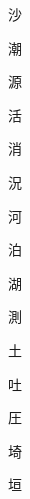 \begin{spacing}{2.5}
{\Huge \begin{CJK}{UTF8}{min} 沙\end{CJK}}\hspace{0.1cm}
{\Huge \begin{CJK}{UTF8}{min} 潮\end{CJK}}\hspace{0.1cm}
{\Huge \begin{CJK}{UTF8}{min} 源\end{CJK}}\hspace{0.1cm}
{\Huge \begin{CJK}{UTF8}{min} 活\end{CJK}}\hspace{0.1cm}
{\Huge \begin{CJK}{UTF8}{min} 消\end{CJK}}\hspace{0.1cm}
{\Huge \begin{CJK}{UTF8}{min} 況\end{CJK}}\hspace{0.1cm}
{\Huge \begin{CJK}{UTF8}{min} 河\end{CJK}}\hspace{0.1cm}
{\Huge \begin{CJK}{UTF8}{min} 泊\end{CJK}}\hspace{0.1cm}
{\Huge \begin{CJK}{UTF8}{min} 湖\end{CJK}}\hspace{0.1cm}
{\Huge \begin{CJK}{UTF8}{min} 測\end{CJK}}\hspace{0.1cm}
{\Huge \begin{CJK}{UTF8}{min} 土\end{CJK}}\hspace{0.1cm}
{\Huge \begin{CJK}{UTF8}{min} 吐\end{CJK}}\hspace{0.1cm}
{\Huge \begin{CJK}{UTF8}{min} 圧\end{CJK}}\hspace{0.1cm}
{\Huge \begin{CJK}{UTF8}{min} 埼\end{CJK}}\hspace{0.1cm}
{\Huge \begin{CJK}{UTF8}{min} 垣\end{CJK}}\hspace{0.1cm}

\end{spacing}
